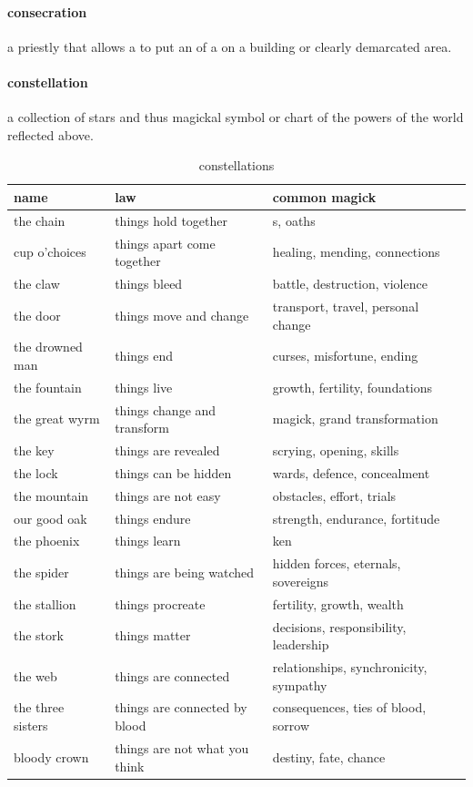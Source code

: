 \paragraph{consecration} a priestly  that allows a  to put an  of a  on a building or clearly demarcated area.
\paragraph{constellation} a collection of stars and thus magickal symbol or chart of the powers of the world reflected above. \begin{table}\centering \begin{tabular}{lp{}p{}} name& law& common magick\\ \hline the chain & things hold together & \s{bond}s, oaths \\ cup o'choices & things apart come together & healing, mending, connections \\ the claw & things bleed & battle, destruction, violence \\ the door & things move and change & transport, travel, personal change \\ the drowned man & things end & curses, misfortune, ending \\ the fountain & things live & growth, fertility, foundations \\ the great wyrm & things change and transform & magick, grand transformation \\ the key & things are revealed & scrying, opening, skills \\ the lock & things can be hidden & wards, defence, concealment \\ the mountain & things are not easy & obstacles, effort, trials \\ our good oak & things endure & strength, endurance, fortitude \\ the phoenix & things learn & ken \\ the spider & things are being watched & hidden forces, eternals, sovereigns \\ the stallion & things procreate & fertility, growth, wealth \\ the stork & things matter & decisions, responsibility, leadership \\ the web & things are connected & relationships, synchronicity, sympathy \\ the three sisters & things are connected by blood & consequences, ties of blood, sorrow \\ bloody crown & things are not what you think & destiny, fate, chance \end{tabular} \caption{constellations} \end{table}
